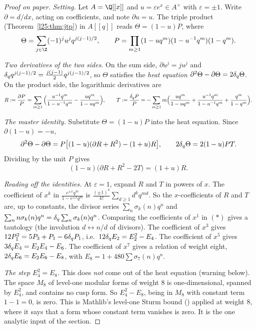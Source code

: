 \begin{proof}[Proof on paper]
\emph{Setting.} Let $A=\Q[[x]]$ and $u=\varepsilon e^x\in A^\times$ with $\varepsilon=\pm1$. Write $\partial=d/dx$, acting on
coefficients, and note $\partial u=u$. The triple product (Theorem~\ref{l25:thm:jtp}) in $A[[q]]$ reads
$\Theta=(1-u)P$, where
\begin{equation*}
\Theta=\sum_{j\in\Z}(-1)^ju^jq^{j(j-1)/2},\qquad P=\prod_{m\ge1}(1-uq^m)(1-u^{-1}q^m)(1-q^m).
\end{equation*}

\emph{Two derivatives of the two sides.} On the sum side, $\partial u^j=ju^j$ and $\delta_q q^{j(j-1)/2}=\frac{j(j-1)}2q^{j(j-1)/2}$,
so $\Theta$ satisfies the \emph{heat equation} $\partial^2\Theta-\partial\Theta=2\delta_q\Theta$. On the product side,
the logarithmic derivatives are
\begin{equation*}
R:=\frac{\partial P}{P}=\sum_{m\ge1}\Big(\frac{u^{-1}q^m}{1-u^{-1}q^m}-\frac{uq^m}{1-uq^m}\Big),\qquad
T:=\frac{\delta_q P}{P}=-\sum_{m\ge1}m\Big(\frac{uq^m}{1-uq^m}+\frac{u^{-1}q^m}{1-u^{-1}q^m}+\frac{q^m}{1-q^m}\Big).
\end{equation*}

\emph{The master identity.} Substitute $\Theta=(1-u)P$ into the heat equation. Since $\partial(1-u)=-u$,
\begin{equation*}
\partial^2\Theta-\partial\Theta=P\big[(1-u)(\partial R+R^2)-(1+u)R\big],\qquad 2\delta_q\Theta=2(1-u)PT .
\end{equation*}
Dividing by the unit $P$ gives
\begin{equation*}
(1-u)\big(\partial R+R^2-2T\big)=(1+u)R. \tag{$*$}
\end{equation*}

\emph{Reading off the identities.} At $\varepsilon=1$, expand $R$ and $T$ in powers of $x$. The coefficient of $x^{k}$ in
$\frac{e^{\pm x}q^m}{1-e^{\pm x}q^m}$ is $\frac{(\pm1)^k}{k!}\sum_{d\ge1}d^kq^{md}$. So the $x$-coefficients of $R$ and $T$ are,
up to constants, the divisor series $\sum_n\sigma_k(n)q^n$ and $\sum_nn\sigma_{k}(n)q^n=\delta_q\sum_n\sigma_k(n)q^n$.
Comparing the coefficients of $x^1$ in $(*)$ gives a tautology (the involution $d\leftrightarrow n/d$ of divisors). The
coefficient of $x^3$ gives $12P_1^2=5P_3+P_1-6\delta_q P_1$, i.e.\ $12\delta_q E_2=E_2^2-E_4$. The coefficient
of $x^5$ gives $3\delta_q E_4=E_2E_4-E_6$. The coefficient of $x^7$ gives a relation of weight eight,
$2\delta_q E_6=E_2E_6-E_8$, with $E_8=1+480\sum\sigma_7(n)q^n$.

\emph{The step $E_4^2=E_8$.} This does \emph{not} come out of the heat equation (warning below). The space $M_8$ of
level-one modular forms of weight $8$ is one-dimensional, spanned by $E_4^2$, and contains no cusp form. So $E_4^2-E_8$,
being in $M_8$ with constant term $1-1=0$, is zero. This is Mathlib's level-one Sturm bound
() applied at weight $8$, where it says that a form whose constant term vanishes is
zero. It is the one analytic input of the section.
\end{proof}
